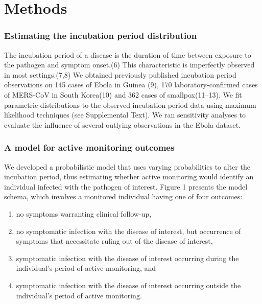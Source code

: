 \documentclass[]{article}
\providecommand{\tightlist}{%
  \setlength{\itemsep}{0pt}\setlength{\parskip}{0pt}}
\begin{document}
\section{Methods}\label{methods}

\subsubsection{Estimating the incubation period
distribution}\label{estimating-the-incubation-period-distribution}

The incubation period of a disease is the duration of time between
exposure to the pathogen and symptom onset.(6) This characteristic is
imperfectly observed in most settings.(7,8) We obtained previously
published incubation period observations on 145 cases of Ebola in Guinea
(9), 170 laboratory-confirmed cases of MERS-CoV in South Korea(10) and
362 cases of smallpox(11--13). We fit parametric distributions to the
observed incubation period data using maximum likelihood techniques (see
Supplemental Text). We ran sensitivity analyses to evaluate the
influence of several outlying observations in the Ebola dataset.

\subsubsection{A model for active monitoring
outcomes}\label{a-model-for-active-monitoring-outcomes}

We developed a probabilistic model that uses varying probabilities to
alter the incubation period, thus estimating whether active monitoring
would identify an individual infected with the pathogen of interest.
Figure 1 presents the model schema, which involves a monitored
individual having one of four outcomes:

\begin{enumerate}
\def\labelenumi{\arabic{enumi}.}
\tightlist
\item
  no symptoms warranting clinical follow-up,
\item
  no symptomatic infection with the disease of interest, but occurrence
  of symptoms that necessitate ruling out of the disease of interest,
\item
  symptomatic infection with the disease of interest occurring during
  the individual's period of active monitoring, and
\item
  symptomatic infection with the disease of interest occurring outside
  the individual's period of active monitoring.
\end{enumerate}
\end{document}
